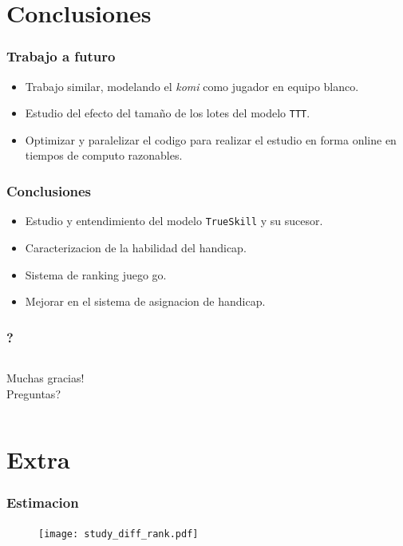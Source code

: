 \documentclass{beamer}
\begin{document}
\section{Conclusiones}
\begin{frame}
\frametitle{Trabajo a futuro}
     \begin{itemize}
        \item Trabajo similar, modelando el \emph{komi} como jugador en equipo blanco.
        \item Estudio del efecto del tama\~no de los lotes del modelo \texttt{TTT}.
        \item Optimizar y paralelizar el codigo para realizar el estudio en forma online en tiempos de computo razonables.
    \end{itemize} 

\end{frame}

\begin{frame}
\frametitle{Conclusiones}
     \begin{itemize}
        \item Estudio y entendimiento del modelo \texttt{TrueSkill} y su sucesor.
        \item Caracterizacion de la habilidad del handicap.
        \item Sistema de ranking juego go.
        \item Mejorar en el sistema de asignacion de handicap.
    \end{itemize} 
\end{frame}

\begin{frame}
\frametitle{?}
\begin{columns}
\begin{mdframed}[backgroundcolor=frenchblue!20]
\centering
\vspace{0.3cm}
Muchas gracias! \\
\vspace{1cm}
Preguntas?
\vspace{0.3cm}
\end{mdframed}
\end{columns}
\end{frame}
\appendix
\section{Extra}

\begin{frame}
\frametitle{Estimacion}

  \begin{figure}[H]
	\centering
	\texttt{[image: study\_diff\_rank.pdf]}
\end{figure}
\end{frame}
\end{document}
